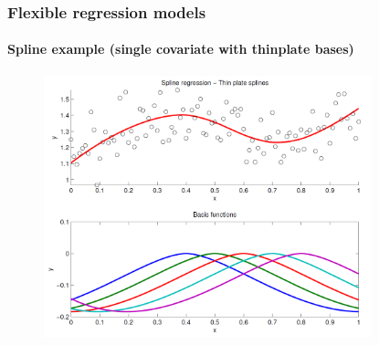 \documentclass[10pt]{beamer}
\begin{document}

\begin{frame}
  \frametitle{Flexible regression models}
  \framesubtitle{Spline example (single covariate with thinplate bases)}
  \begin{center}
    \begin{figure}
      \includegraphics[width=9.5cm]{spline2.png}
    \end{figure}
  \end{center}
\end{frame}
\end{document}
